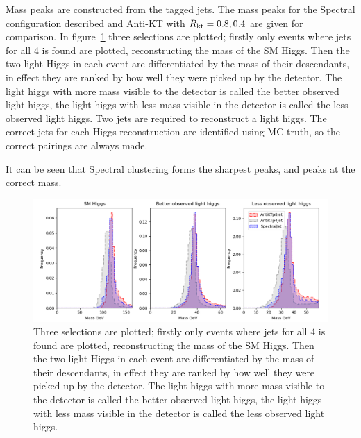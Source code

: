 Mass peaks are constructed from the tagged jets.
The mass peaks for the Spectral configuration described and Anti-KT 
with \(R{}_\text{kt} = 0.8, 0.4\) are given for comparison.
In figure~\ref{fig:best_correct_h_allocation} three selections are plotted; firstly only events where jets for all 4  is found
are plotted, reconstructing the mass of the SM Higgs.
Then the two light Higgs in each event are differentiated by the mass of their descendants,
in effect they are ranked by how well they were picked up by the detector.
The light higgs with more mass visible to the detector is called the better observed light higgs,
the light higgs with less mass visible in the detector is called the less observed light higgs.
Two jets are required to reconstruct a light higgs.
The correct jets for each Higgs reconstruction are identified using MC truth,
so the correct pairings are always made.

It can be seen that Spectral clustering forms the sharpest peaks, and peaks at the correct mass.


\begin{figure}[htp]
    \includegraphics[width=1.\textwidth]{graphics/mass_peaks/light_long_correct_frequency.png}
    \caption{
Three selections are plotted; firstly only events where jets for all 4  is found
are plotted, reconstructing the mass of the SM Higgs.
Then the two light Higgs in each event are differentiated by the mass of their descendants,
in effect they are ranked by how well they were picked up by the detector.
The light higgs with more mass visible to the detector is called the better observed light higgs,
the light higgs with less mass visible in the detector is called the less observed light higgs.
    }\label{fig:best_correct_h_allocation}
\end{figure}    



